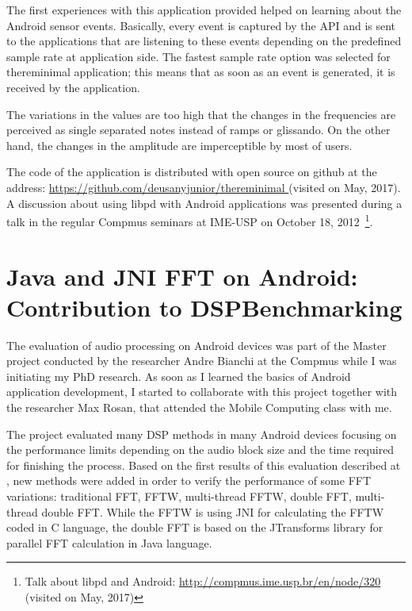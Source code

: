 The first experiences with this application provided helped on learning about the Android sensor events.
Basically, every event is captured by the API and is sent to the applications that are listening to these events depending on the predefined sample rate at application side.
The fastest sample rate option was selected for thereminimal application; this means that as soon as an event is generated, it is received by the application.

The variations in the values are too high that the changes in the frequencies are perceived as single separated notes instead of ramps or glissando.
On the other hand, the changes in the amplitude are imperceptible by most of users.

The code of the application is distributed with open source on github at the address: \url{https://github.com/deusanyjunior/thereminimal
} (visited on May, 2017).
A discussion about using libpd with Android applications was presented during a talk in the regular Compmus seminars at IME-USP on October 18, 2012~\footnote{Talk about libpd and Android: \url{http://compmus.ime.usp.br/en/node/320} (visited on May, 2017)}.

\section{Java and JNI FFT on Android: Contribution to DSPBenchmarking}
\label{apesec:appdspbenchmarking}

The evaluation of audio processing on Android devices was part of the Master project conducted by the researcher Andre Bianchi at the Compmus while I was initiating my PhD research.
As soon as I learned the basics of Android application development, I started to collaborate with this project together with the researcher Max Rosan, that attended the Mobile Computing class with me.

The project evaluated many DSP methods in many Android devices focusing on the performance limits depending on the audio block size and the time required for finishing the process.
Based on the first results of this evaluation described at \cite{Bianchi2012ontheperformance}, new methods were added in order to verify the performance of some FFT variations:
traditional FFT, FFTW, multi-thread FFTW, double FFT, multi-thread double FFT.
While the FFTW is using JNI for calculating the FFTW coded in C language, the double FFT is based on the JTransforms library for parallel FFT calculation in Java language.


